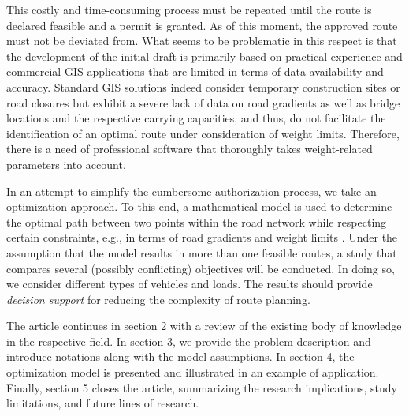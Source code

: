 This costly and time-consuming process must be repeated until the route is declared feasible and a permit is granted. As of this moment, the approved route must not be deviated from.
What seems to be problematic in this respect is that the development of the initial draft is primarily based on practical experience and commercial GIS applications that are limited in terms of data availability and accuracy.
Standard GIS solutions indeed consider temporary construction sites or road closures but exhibit a severe lack of data on road gradients as well as bridge locations and the respective carrying capacities, and thus, do not facilitate the identification of an optimal route under consideration of weight limits.
Therefore, there is a need of professional software that thoroughly takes weight-related parameters into account.
\par In an attempt to simplify the cumbersome authorization process, we take an optimization approach.
To this end, a mathematical model is used to determine the optimal path between two points within the road network while respecting certain constraints, e.g., in terms of road gradients and weight limits \cite{liedtke2012generation, zhu2014vehicle}.
Under the assumption that the model results in more than one feasible routes, a study that compares several (possibly conflicting) objectives will be conducted.
In doing so, we consider different types of vehicles and loads. The results should provide \textit{decision support} for reducing the complexity of \ohc route planning.
\par
The article continues in section 2 with a review of the existing body of knowledge in the respective field.
In section 3, we provide the problem description and introduce notations along with the model assumptions. In section 4, the optimization model is presented and illustrated in an example of application.
Finally, section 5 closes the article, summarizing the research implications, study limitations, and future lines of research.
